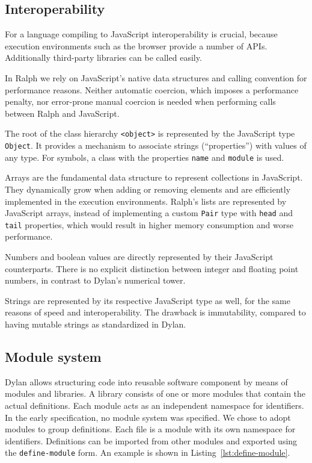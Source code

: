 \documentclass{acm_proc_article-sp}
\begin{document}
\subsection{Interoperability}

For a language compiling to JavaScript interoperability is crucial,
because execution environments such as the browser provide a number
of APIs. Additionally third-party libraries can be called easily.

In Ralph we rely on JavaScript's native data structures and calling
convention for performance reasons. Neither automatic coercion, which
imposes a performance penalty, nor error-prone manual coercion is
needed when performing calls between Ralph and JavaScript.

The root of the class hierarchy \texttt{<object>} is represented by
the JavaScript type \texttt{Object}. It provides a mechanism to
associate strings (``properties'') with values of any type. For
symbols, a class with the properties \texttt{name} and \texttt{module}
is used.

Arrays are the fundamental data structure to represent collections in
JavaScript. They dynamically grow when adding or removing elements and
are efficiently implemented in the execution environments.
Ralph's lists are represented by JavaScript arrays, instead of
implementing a custom \texttt{Pair} type with \texttt{head} and
\texttt{tail} properties, which would result in higher memory
consumption and worse performance.

Numbers and boolean values are directly represented by their
JavaScript counterparts. There is no explicit distinction between
integer and floating point numbers, in contrast to Dylan's numerical
tower.

Strings are represented by its respective JavaScript type as
well, for the same reasons of speed and interoperability. The drawback
is immutability, compared to having mutable strings as standardized in
Dylan.


\subsection{Module system}

Dylan allows structuring code into reusable software component by
means of modules and libraries. A library consists of one or more
modules that contain the actual definitions. Each module acts as an
independent namespace for identifiers. In the early specification,
no module system was specified. We chose to adopt modules to group
definitions. Each file is a module with its own namespace for
identifiers. Definitions can be imported from other modules and
exported using the \texttt{define-module} form. An example is shown in
Listing~\ref{lst:define-module}.
\end{document}
